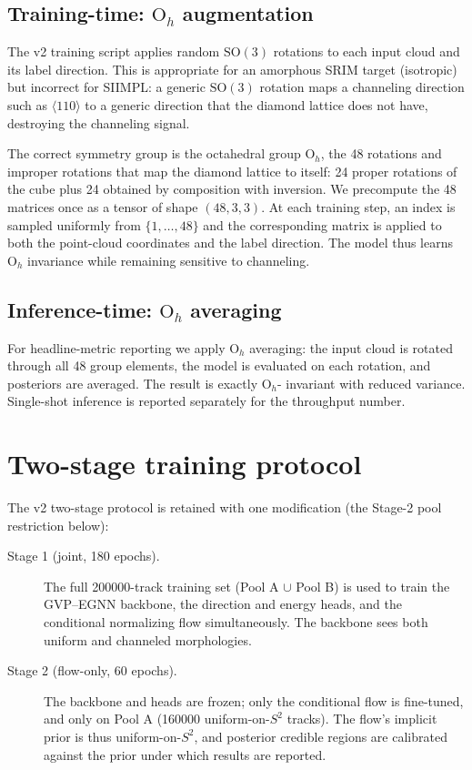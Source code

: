 \documentclass[11pt]{article}
\begin{document}
\subsection{Training-time: $\mathrm{O}_h$ augmentation}

The v2 training script applies random $\mathrm{SO}(3)$ rotations to each input
cloud and its label direction. This is appropriate for an amorphous SRIM
target (isotropic) but incorrect for SIIMPL: a generic $\mathrm{SO}(3)$
rotation maps a channeling direction such as $\langle 110\rangle$ to a generic
direction that the diamond lattice does not have, destroying the channeling
signal.

The correct symmetry group is the octahedral group $\mathrm{O}_h$, the 48
rotations and improper rotations that map the diamond lattice to itself:
24 proper rotations of the cube plus 24 obtained by composition with
inversion. We precompute the 48 matrices once as a tensor of shape
$(48,3,3)$. At each training step, an index is sampled uniformly from
$\{1,\dots,48\}$ and the corresponding matrix is applied to both the
point-cloud coordinates and the label direction. The model thus learns
$\mathrm{O}_h$ invariance while remaining sensitive to channeling.

\subsection{Inference-time: $\mathrm{O}_h$ averaging}

For headline-metric reporting we apply $\mathrm{O}_h$ averaging: the input
cloud is rotated through all 48 group elements, the model is evaluated on each
rotation, and posteriors are averaged. The result is exactly $\mathrm{O}_h$-
invariant with reduced variance. Single-shot inference is reported separately
for the throughput number.

\section{Two-stage training protocol}

The v2 two-stage protocol is retained with one modification (the Stage-2 pool
restriction below):
\begin{description}
  \item[Stage 1 (joint, 180 epochs).] The full \num{200000}-track training set
    (Pool A $\cup$ Pool B) is used to train the GVP--EGNN backbone, the direction
    and energy heads, and the conditional normalizing flow simultaneously.
    The backbone sees both uniform and channeled morphologies.
  \item[Stage 2 (flow-only, 60 epochs).] The backbone and heads are frozen;
    only the conditional flow is fine-tuned, and only on Pool A
    (\num{160000} uniform-on-$S^2$ tracks). The flow's implicit prior is thus
    uniform-on-$S^2$, and posterior credible regions are calibrated against
    the prior under which results are reported.
\end{description}
\end{document}
